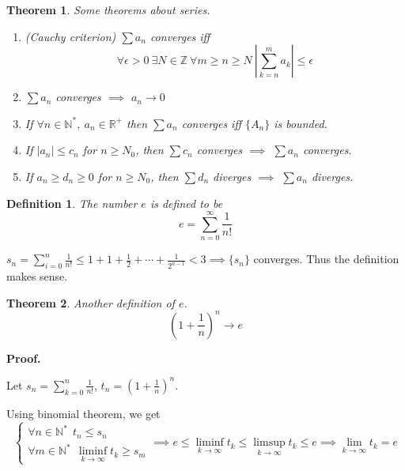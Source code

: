 \documentclass[aps,pra,onecolumn,notitlepage,superscriptaddress]{revtex4-1}
\newcommand{\N}{\mathbb{N}}
\newcommand{\Z}{\mathbb{Z}}
\newcommand{\R}{\mathbb{R}}
\newtheorem{theo}{Theorem}
\newtheorem{defi}{Definition}
\def\Proof{{\bf Proof.~}}
\begin{document}
    \begin{theo} Some theorems about series.
        \begin{enumerate}
            \item (Cauchy criterion) $\sum a_n$ converges iff 
            \begin{equation}
                \forall \epsilon > 0 \ \exists N \in \Z \ \forall m \geq n \geq N \ \left| \sum_{k=n}^m a_k \right| \leq \epsilon
            \end{equation}
            \item $\sum a_n$ converges $\implies$ $a_n \to 0$
            \item If $\forall n \in \N^*, \ a_n \in \R^+$ then $\sum a_n$ converges iff $\{A_n\}$ is bounded.

            \item If $| a_n | \leq c_n$ for $n \geq N_0$, then $\sum c_n$ converges $\implies$ $\sum a_n$ converges.

            \item If $a_n \geq d_n \geq 0$ for $n \geq N_0$, then $\sum d_n$ diverges $\implies$ $\sum a_n$ diverges.
        \end{enumerate}
    \end{theo}

    \begin{defi}
        The number $e$ is defined to be
        \begin{equation}
            e = \sum_{n=0}^{\infty} \frac{1}{n!}
        \end{equation}
    \end{defi}

    $s_n = \sum_{i=0}^n \frac{1}{n!} \leq 1 + 1 + \frac{1}{2} + \cdots + \frac{1}{2^{n-1}} < 3 \implies \{s_n\}$ converges. Thus the definition makes sense.

    \begin{theo}
        Another definition of $e$.
        \begin{equation}
            (1+\frac{1}{n})^n \to e
        \end{equation}
    \end{theo}
    \begin{framed}
        \Proof {
            Let $s_n = \sum_{k=0}^n \frac{1}{n!}$, $t_n = (1+\frac{1}{n})^n$.

            Using binomial theorem, we get
            \begin{equation}
                \begin{cases}
                    \forall n \in \N^* \ \ t_n \leq s_n \\
                    \forall m \in \N^* \ \ \liminf_{k \to \infty} t_k \geq s_m
                \end{cases}
                \implies e \leq \liminf_{k \to \infty} t_k \leq \limsup_{k \to \infty} t_k \leq e
                \implies \lim_{k \to \infty} t_k = e
            \end{equation}
        }
    \end{framed}
\end{document}
